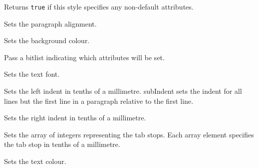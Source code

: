 Returns {\tt true} if this style specifies any non-default attributes.


\label{wxtextattrsetalignment}


Sets the paragraph alignment.


\label{wxtextattrsetbackgroundcolour}


Sets the background colour.


\label{wxtextattrsetflags}


Pass a bitlist indicating which attributes will be set.


\label{wxtextattrsetfont}


Sets the text font.


\label{wxtextattrsetleftindent}


Sets the left indent in tenths of a millimetre.
subIndent sets the indent for all lines but the first line in a paragraph 
relative to the first line.


\label{wxtextattrsetrightindent}


Sets the right indent in tenths of a millimetre.


\label{wxtextattrsettabs}


Sets the array of integers representing the tab stops. Each
array element specifies the tab stop in tenths of a millimetre.


\label{wxtextattrsettextcolour}


Sets the text colour.


